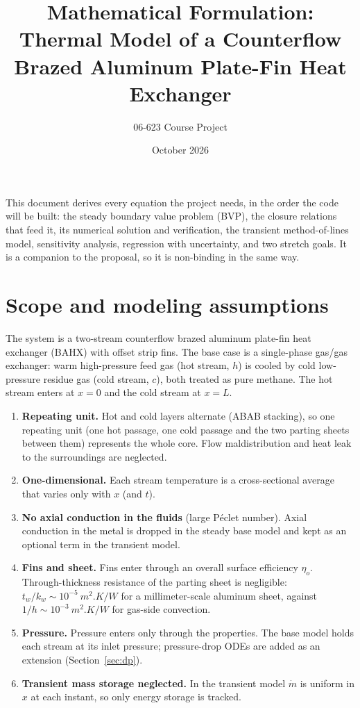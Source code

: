 \documentclass[11pt]{article}
\title{Mathematical Formulation:\\
Thermal Model of a Counterflow Brazed Aluminum Plate-Fin Heat Exchanger}
\author{06-623 Course Project}
\date{October 2026}
\begin{document}
\maketitle

\noindent This document derives every equation the project needs, in the order the code will be built: the steady boundary value problem (BVP), the closure relations that feed it, its numerical solution and verification, the transient method-of-lines model, sensitivity analysis, regression with uncertainty, and two stretch goals. It is a companion to the proposal, so it is non-binding in the same way.

\tableofcontents

\section{Scope and modeling assumptions}

The system is a two-stream counterflow brazed aluminum plate-fin heat exchanger (BAHX) with offset strip fins. The base case is a single-phase gas/gas exchanger: warm high-pressure feed gas (hot stream, $h$) is cooled by cold low-pressure residue gas (cold stream, $c$), both treated as pure methane. The hot stream enters at $x=0$ and the cold stream at $x=L$.

\begin{enumerate}[label=\textbf{A\arabic*.}]
  \item \textbf{Repeating unit.} Hot and cold layers alternate (ABAB stacking), so one repeating unit (one hot passage, one cold passage and the two parting sheets between them) represents the whole core. Flow maldistribution and heat leak to the surroundings are neglected.
  \item \textbf{One-dimensional.} Each stream temperature is a cross-sectional average that varies only with $x$ (and $t$).
  \item \textbf{No axial conduction in the fluids} (large P\'eclet number). Axial conduction in the metal is dropped in the steady base model and kept as an optional term in the transient model.
  \item \textbf{Fins and sheet.} Fins enter through an overall surface efficiency $\eta_o$. Through-thickness resistance of the parting sheet is negligible: $t_w/k_w \sim 10^{-5}\ \si{m^2.K/W}$ for a millimeter-scale aluminum sheet, against $1/h \sim 10^{-3}\ \si{m^2.K/W}$ for gas-side convection.
  \item \textbf{Pressure.} Pressure enters only through the properties. The base model holds each stream at its inlet pressure; pressure-drop ODEs are added as an extension (Section~\ref{sec:dp}).
  \item \textbf{Transient mass storage neglected.} In the transient model $\dot m$ is uniform in $x$ at each instant, so only energy storage is tracked.
\end{enumerate}
\end{document}
